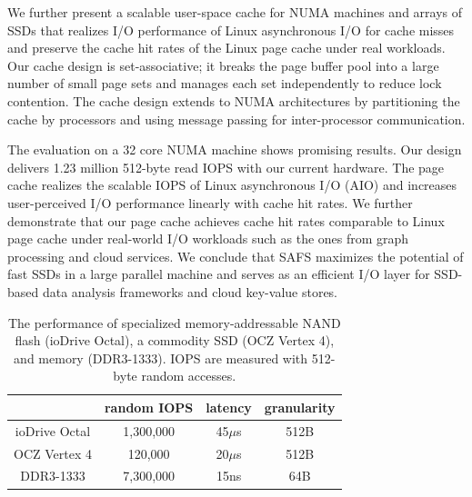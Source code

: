 We further present a scalable user-space cache for NUMA machines and
arrays of SSDs that realizes I/O
performance of Linux asynchronous I/O for cache misses and preserve the 
cache hit rates of the Linux page cache under real workloads. 
Our cache design is set-associative; it breaks
the page buffer pool into a large number of small page sets and
manages each set independently to reduce lock
contention. The cache design extends to NUMA architectures by
partitioning the cache by processors and using message passing for
inter-processor communication.

The evaluation on a 32 core NUMA machine shows promising results. Our design
delivers 1.23 million 512-byte read IOPS with our current hardware.
The page cache realizes the scalable IOPS of Linux asynchronous I/O (AIO)
and increases user-perceived I/O performance linearly with cache hit rates.
We further demonstrate that our page cache achieves cache hit rates comparable
to Linux page cache under real-world I/O workloads such as the ones from
graph processing and cloud services. We conclude that SAFS maximizes the potential
of fast SSDs in a large parallel machine and serves as an efficient I/O layer
for SSD-based data analysis frameworks and cloud key-value stores.


\begin{table}
\begin{center}
\small
\begin{tabular}{|c|c|c|c|}
\hline
& random IOPS & latency & granularity \\
\hline
ioDrive Octal \cite{fusion} & 1,300,000 & 45$\mu$s &512B \\
\hline
OCZ Vertex 4 \cite{ocz} & 120,000 & 20$\mu$s & 512B \\
\hline
DDR3-1333 & 7,300,000 & 15ns & 64B \\
\hline
\end{tabular}
\normalsize
\end{center}
\caption{The performance of specialized memory-addressable NAND flash (ioDrive Octal), a commodity SSD (OCZ Vertex 4), and memory (DDR3-1333). 
IOPS are measured with 512-byte random accesses.}
\label{ssd}
\end{table}

